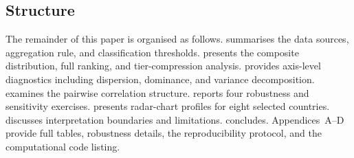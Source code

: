 \subsection{Structure}

The remainder of this paper is organised as follows.
 summarises the data sources, aggregation
rule, and classification thresholds.
 presents the composite distribution,
full ranking, and tier-compression analysis.
 provides axis-level diagnostics including
dispersion, dominance, and variance decomposition.
 examines the pairwise correlation structure.
 reports four robustness and sensitivity
exercises.
 presents radar-chart profiles for eight
selected countries.
 discusses interpretation boundaries and
limitations.
 concludes.
Appendices~A--D provide full tables, robustness details, the
reproducibility protocol, and the computational code listing.
